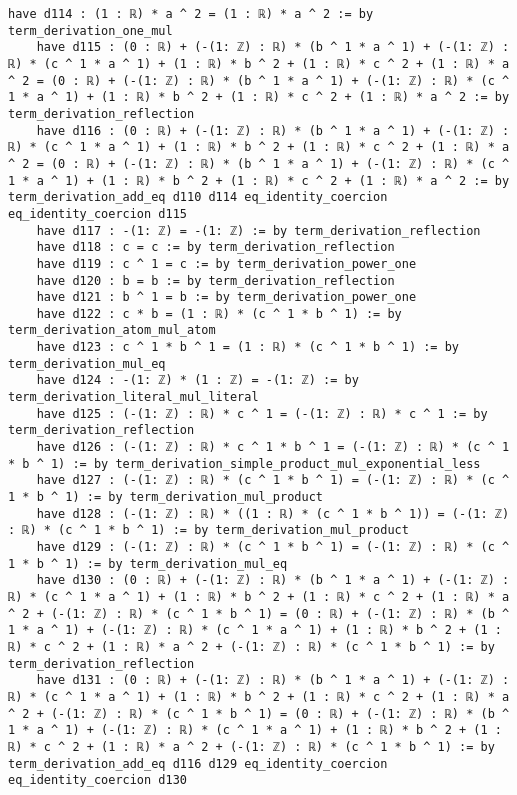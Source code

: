 \documentclass{article}
\begin{document}
\begin{tcolorbox}[colback=white!10, width=\linewidth]
\begin{lstlisting}[language=Lean4]
    have d114 : (1 : ℝ) * a ^ 2 = (1 : ℝ) * a ^ 2 := by term_derivation_one_mul
    have d115 : (0 : ℝ) + (-(1: ℤ) : ℝ) * (b ^ 1 * a ^ 1) + (-(1: ℤ) : ℝ) * (c ^ 1 * a ^ 1) + (1 : ℝ) * b ^ 2 + (1 : ℝ) * c ^ 2 + (1 : ℝ) * a ^ 2 = (0 : ℝ) + (-(1: ℤ) : ℝ) * (b ^ 1 * a ^ 1) + (-(1: ℤ) : ℝ) * (c ^ 1 * a ^ 1) + (1 : ℝ) * b ^ 2 + (1 : ℝ) * c ^ 2 + (1 : ℝ) * a ^ 2 := by term_derivation_reflection
    have d116 : (0 : ℝ) + (-(1: ℤ) : ℝ) * (b ^ 1 * a ^ 1) + (-(1: ℤ) : ℝ) * (c ^ 1 * a ^ 1) + (1 : ℝ) * b ^ 2 + (1 : ℝ) * c ^ 2 + (1 : ℝ) * a ^ 2 = (0 : ℝ) + (-(1: ℤ) : ℝ) * (b ^ 1 * a ^ 1) + (-(1: ℤ) : ℝ) * (c ^ 1 * a ^ 1) + (1 : ℝ) * b ^ 2 + (1 : ℝ) * c ^ 2 + (1 : ℝ) * a ^ 2 := by term_derivation_add_eq d110 d114 eq_identity_coercion eq_identity_coercion d115
    have d117 : -(1: ℤ) = -(1: ℤ) := by term_derivation_reflection
    have d118 : c = c := by term_derivation_reflection
    have d119 : c ^ 1 = c := by term_derivation_power_one
    have d120 : b = b := by term_derivation_reflection
    have d121 : b ^ 1 = b := by term_derivation_power_one
    have d122 : c * b = (1 : ℝ) * (c ^ 1 * b ^ 1) := by term_derivation_atom_mul_atom
    have d123 : c ^ 1 * b ^ 1 = (1 : ℝ) * (c ^ 1 * b ^ 1) := by term_derivation_mul_eq
    have d124 : -(1: ℤ) * (1 : ℤ) = -(1: ℤ) := by term_derivation_literal_mul_literal
    have d125 : (-(1: ℤ) : ℝ) * c ^ 1 = (-(1: ℤ) : ℝ) * c ^ 1 := by term_derivation_reflection
    have d126 : (-(1: ℤ) : ℝ) * c ^ 1 * b ^ 1 = (-(1: ℤ) : ℝ) * (c ^ 1 * b ^ 1) := by term_derivation_simple_product_mul_exponential_less
    have d127 : (-(1: ℤ) : ℝ) * (c ^ 1 * b ^ 1) = (-(1: ℤ) : ℝ) * (c ^ 1 * b ^ 1) := by term_derivation_mul_product
    have d128 : (-(1: ℤ) : ℝ) * ((1 : ℝ) * (c ^ 1 * b ^ 1)) = (-(1: ℤ) : ℝ) * (c ^ 1 * b ^ 1) := by term_derivation_mul_product
    have d129 : (-(1: ℤ) : ℝ) * (c ^ 1 * b ^ 1) = (-(1: ℤ) : ℝ) * (c ^ 1 * b ^ 1) := by term_derivation_mul_eq
    have d130 : (0 : ℝ) + (-(1: ℤ) : ℝ) * (b ^ 1 * a ^ 1) + (-(1: ℤ) : ℝ) * (c ^ 1 * a ^ 1) + (1 : ℝ) * b ^ 2 + (1 : ℝ) * c ^ 2 + (1 : ℝ) * a ^ 2 + (-(1: ℤ) : ℝ) * (c ^ 1 * b ^ 1) = (0 : ℝ) + (-(1: ℤ) : ℝ) * (b ^ 1 * a ^ 1) + (-(1: ℤ) : ℝ) * (c ^ 1 * a ^ 1) + (1 : ℝ) * b ^ 2 + (1 : ℝ) * c ^ 2 + (1 : ℝ) * a ^ 2 + (-(1: ℤ) : ℝ) * (c ^ 1 * b ^ 1) := by term_derivation_reflection
    have d131 : (0 : ℝ) + (-(1: ℤ) : ℝ) * (b ^ 1 * a ^ 1) + (-(1: ℤ) : ℝ) * (c ^ 1 * a ^ 1) + (1 : ℝ) * b ^ 2 + (1 : ℝ) * c ^ 2 + (1 : ℝ) * a ^ 2 + (-(1: ℤ) : ℝ) * (c ^ 1 * b ^ 1) = (0 : ℝ) + (-(1: ℤ) : ℝ) * (b ^ 1 * a ^ 1) + (-(1: ℤ) : ℝ) * (c ^ 1 * a ^ 1) + (1 : ℝ) * b ^ 2 + (1 : ℝ) * c ^ 2 + (1 : ℝ) * a ^ 2 + (-(1: ℤ) : ℝ) * (c ^ 1 * b ^ 1) := by term_derivation_add_eq d116 d129 eq_identity_coercion eq_identity_coercion d130

\end{lstlisting}
\end{tcolorbox}
\end{document}
